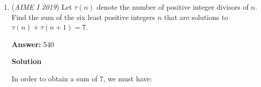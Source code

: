 \begin{enumerate}
 A quick note: this solution uses recursion and is similar to the solution 7 above. It was from trumpeter, posted in the AoPS Forums, Contest Discussion.

 



\textbf{Solution 10 (Algebra but not bad)}

Note that from the Pythagorean identity, $\sin^{2}(x)+\cos^{2}(x)=1$. Now, let $m=\sin^{2}(x)$ and let $n=\cos^{2}(x)$. Now, we seek $m^{6}+n^{6}$ given

 $m+n=1$, and$m^{5}+n^{5}=\frac{11}{36}$. 

 Now, note the factorization $m^{5}+n^{5}=(m+n)(m^{4}-m^{3}n+m^{2}n^{2}-mn^{3}+n^{4})=\frac{11}{36}$, so
 \[m^{4}-m^{3}n+m^{2}n^{2}-mn^{3}+n^{4}=\frac{11}{36}\].

 Now, we also have $(m+n)^{4}=m^{4}+4m^{3}n+6m^{2}n^{2}+4mn^{2}+n^{4}=1$. Now, upon subtraction, we obtain
 \[5(m^{3}n+m^{2}n^{2}+mn^{3})=\frac{25}{36} \rightarrow m^{3}n+m^{2}n^{2}+mn^{3}=\frac{5}{36}\].

 This tells us that $mn(m^{2}+mn+n^{2})=\frac{5}{36}$. However, note that $m^{2}+2mn+n^{2}=(m+n)^{2}=1$, so if we let $a=mn$, we have
 \[a(1-a)=\frac{5}{36}\].

 Solving this quadratic yields $a=\frac{1}{6}$ and $a=\frac{5}{6}$. Now, note that $a \neq \frac{5}{6}$ because of the fact that $\sin^{2}(x) \cos^{2}(x)$ is really small, so $a=\frac{1}{6}$. 

 Now, we seek $m^{6}+n^{6}$. This can be found by finding $(m^{3}+n^{3})^{2}-2m^{3}n^{3}$. 

 We have $m^{3}+n^{3}=(m+n)(m^{2}-mn+n^{2})=(1)\left(1^{2}-3\left(\frac{1}{6}\right)\right)=\frac{1}{2}$. Thus, our desired value is

 
 \[\left(\frac{1}{2}\right)^{2}-2\left(\frac{1}{6}\right)^{3}=\frac{1}{4}-\frac{1}{108}=\frac{13}{54}\]and the desired extraction is $13+54=\fbox{067}$



	\item (\textit{AIME I 2019}) Let $\tau(n)$ denote the number of positive integer divisors of $n$. Find the sum of the six least positive integers $n$ that are solutions to $\tau (n) + \tau (n+1) = 7$.


 
 \textbf{Answer: }540



\textbf{Solution}

In order to obtain a sum of $7$, we must have:


\end{enumerate}
